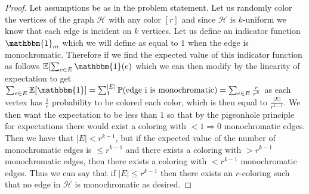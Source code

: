 \documentclass[11pt]{amsart}
\newcommand\cH{{\mathcal H}}
\theoremstyle{definition}
\begin{document}
\begin{proof}
    Let assumptions be as in the problem statement. Let us randomly color the vertices of the graph $\cH$ with any color $[r]$ and since $\cH$ is $k$-uniform we know that each edge is incident on $k$ vertices. Let us define an indicator function $\mathbbm{1}_m$ which we will define as equal to $1$ when the edge is monochromatic. Therefore if we find the expected value of this indicator function as follows $\mathbb{E}[\sum_{e\in E}\mathbbm{1}(e)$ which we can then modify by the linearity of expectation to get $\sum_{e\in E}\mathbb{E}[\mathbbm{1}] = \sum_{1}^{|E|}\mathbb{P}(\text{edge i is monochromatic}) = \sum_{e\in E}\frac{r}{r^k}$ as each vertex has $\frac{1}{r}$ probability to be colored each color, which is then equal to $\frac{|E|}{r^{k-1}}$. We then want the expectation to be less than $1$ so that by the pigeonhole principle for expectations there would exist a coloring with $<1 \Rightarrow0$ monochromatic edges. Then we have that $|E| < r^{k - 1}$, but if the expected value of the number of monochromatic edges is $\leq r^{k-1}$ and there exists a coloring with $> r^{k - 1}$ monochromatic edges, then there exists a coloring with $< r^{k - 1}$ monochromatic edges. Thus we can say that if $|E| \leq r^{k - 1}$ then there exists an $r$-coloring such that no edge in $\cH$ is monochromatic as desired. 
\end{proof}
\end{document}
